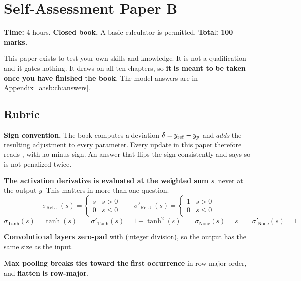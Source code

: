
\chapter{Self-Assessment Paper B}
\label{exb:ch:paper}

\noindent\textbf{Time:} 4 hours. \textbf{Closed book.} A basic calculator is permitted.
\textbf{Total: 100 marks.}

\medskip
This paper exists to test your own skills and knowledge. It is not a qualification and it gates
nothing. It draws on all ten chapters, so \textbf{it is meant to be taken once you have finished the
book}. The model answers are in Appendix~\ref{ansb:ch:answers}.

\section*{Rubric}
\textbf{Sign convention.} The book computes a deviation $\delta = y_{\mathrm{ref}} - y_{p}$ and \emph{adds} the
resulting adjustment to every parameter. Every update in this paper therefore reads
, with no minus sign. An answer that flips the sign
consistently and says so is not penalized twice.

\textbf{The activation derivative is evaluated at the weighted sum $s$}, never at the output $y$.
This matters in more than one question.
\[
  \sigma_{\mathrm{ReLU}}(s) = \begin{cases} s & s > 0 \\ 0 & s \leq 0 \end{cases} \qquad
  \sigma'_{\mathrm{ReLU}}(s) = \begin{cases} 1 & s > 0 \\ 0 & s \leq 0 \end{cases}
\]
\[
  \sigma_{\mathrm{Tanh}}(s) = \tanh(s) \qquad \sigma'_{\mathrm{Tanh}}(s) = 1 - \tanh^2(s) \qquad
  \sigma_{\mathrm{None}}(s) = s \qquad \sigma'_{\mathrm{None}}(s) = 1
\]

\textbf{Convolutional layers zero-pad} with  (integer division), so the
output has the same size as the input.

\textbf{Max pooling breaks ties toward the first occurrence} in row-major order, and \textbf{flatten
is row-major}.

